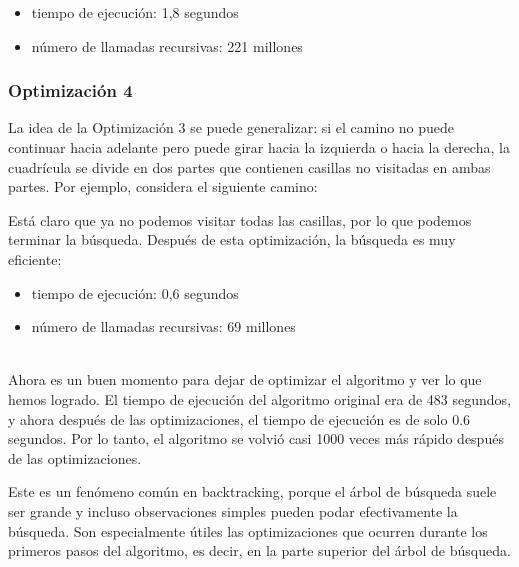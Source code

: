 \begin{itemize}[itemsep=0em,topsep=0.5em]
    \item tiempo de ejecución: 1,8 segundos
    \item número de llamadas recursivas: 221 millones
\end{itemize}

\subsubsection{Optimización 4}

La idea de la Optimización 3
se puede generalizar:
si el camino no puede continuar hacia adelante
pero puede girar hacia la izquierda o hacia la derecha,
la cuadrícula se divide en dos partes
que contienen casillas no visitadas en ambas partes.
Por ejemplo, considera el siguiente camino:

\begin{center}
\end{center}
Está claro que ya no podemos visitar todas las casillas,
por lo que podemos terminar la búsqueda.
Después de esta optimización, la búsqueda es
muy eficiente:

\begin{itemize}[itemsep=0em,topsep=0.5em]
    \item tiempo de ejecución: 0,6 segundos
    \item número de llamadas recursivas: 69 millones
\end{itemize}

~\\
Ahora es un buen momento para dejar de optimizar
el algoritmo y ver lo que hemos logrado.
El tiempo de ejecución del algoritmo original
era de 483 segundos,
y ahora después de las optimizaciones,
el tiempo de ejecución es de solo 0.6 segundos.
Por lo tanto, el algoritmo se volvió casi 1000 veces
más rápido después de las optimizaciones.

Este es un fenómeno común en backtracking,
porque el árbol de búsqueda suele ser grande
y incluso observaciones simples pueden podar efectivamente
la búsqueda.
Son especialmente útiles las optimizaciones que
ocurren durante los primeros pasos del algoritmo,
es decir, en la parte superior del árbol de búsqueda.

